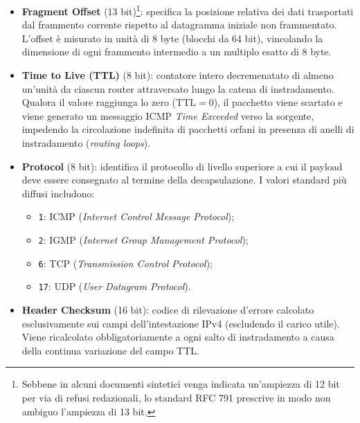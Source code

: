 \documentclass[11pt, a4paper]{article}
\begin{document}
\begin{itemize}
\begin{itemize}[noitemsep]
        \item Bit 1: DF (\emph{Don't Fragment}). Se posto a 1, proibisce ai router intermedi di frammentare il pacchetto; qualora il pacchetto ecceda la MTU del link uscente, viene scartato e il router invia un messaggio di errore ICMP;
        \item Bit 2: MF (\emph{More Fragments}). Se posto a 1, indica che il frammento corrente non è l'ultimo; se posto a 0, specifica che il frammento è l'ultimo della serie o che il pacchetto non è stato frammentato.
    \end{itemize}
    \item \textbf{Fragment Offset} (13 bit)\footnote{Sebbene in alcuni documenti sintetici venga indicata un'ampiezza di 12 bit per via di refusi redazionali, lo standard RFC 791 prescrive in modo non ambiguo l'ampiezza di 13 bit.}: specifica la posizione relativa dei dati trasportati dal frammento corrente rispetto al datagramma iniziale non frammentato. L'offset è misurato in unità di 8 byte (blocchi da 64 bit), vincolando la dimensione di ogni frammento intermedio a un multiplo esatto di 8 byte.
    \item \textbf{Time to Live (TTL)} (8 bit): contatore intero decremenatato di almeno un'unità da ciascun router attraversato lungo la catena di instradamento. Qualora il valore raggiunga lo zero ($\text{TTL} = 0$), il pacchetto viene scartato e viene generato un messaggio ICMP \emph{Time Exceeded} verso la sorgente, impedendo la circolazione indefinita di pacchetti orfani in presenza di anelli di instradamento (\emph{routing loops}).
    \item \textbf{Protocol} (8 bit): identifica il protocollo di livello superiore a cui il payload deve essere consegnato al termine della decapsulazione. I valori standard più diffusi includono:
    \begin{itemize}[noitemsep]
        \item \texttt{1}: ICMP (\emph{Internet Control Message Protocol});
        \item \texttt{2}: IGMP (\emph{Internet Group Management Protocol});
        \item \texttt{6}: TCP (\emph{Transmission Control Protocol});
        \item \texttt{17}: UDP (\emph{User Datagram Protocol}).
    \end{itemize}
    \item \textbf{Header Checksum} (16 bit): codice di rilevazione d'errore calcolato esclusivamente sui campi dell'intestazione IPv4 (escludendo il carico utile). Viene ricalcolato obbligatoriamente a ogni salto di instradamento a causa della continua variazione del campo TTL.

\end{itemize}
\end{document}
